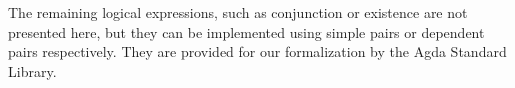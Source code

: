 \begin{code}
    \>[0]\AgdaSpace{}%
    \AgdaSymbol{:}\AgdaSpace{}%
    \AgdaSymbol{\{}\AgdaSpace{}%
    \AgdaSpace{}%
    \AgdaSymbol{:}\AgdaSpace{}%
    \AgdaSymbol{\}}\AgdaSpace{}%
    \AgdaSpace{}%
    \AgdaSpace{}%
    \AgdaSpace{}%
    \AgdaSpace{}%
    \AgdaSpace{}%
    \AgdaSpace{}%
    \AgdaSpace{}%
    \AgdaSpace{}%
    \AgdaSymbol{(}\AgdaSpace{}%
    \AgdaOperator{\AgdaFunction{+}}\AgdaSpace{}%
    \AgdaSymbol{)}\<%
    \\
    \>[0]\AgdaSpace{}%
    \AgdaSpace{}%
    \AgdaSpace{}%
    \AgdaSymbol{=}\AgdaSpace{}%
    \<%
    \\
    \>[0]\AgdaSpace{}%
    \AgdaSymbol{(}\AgdaSpace{}%
    \AgdaSymbol{)}\AgdaSpace{}%
    \AgdaSpace{}%
    \AgdaSymbol{=}\AgdaSpace{}%
    \AgdaSpace{}%
    \AgdaSymbol{(}\AgdaSpace{}%
    \AgdaSpace{}%
    \AgdaSymbol{)}\<%
\end{code}

The remaining logical expressions, such as conjunction or existence are not presented here, but they can be implemented using simple pairs or dependent pairs respectively. They are provided for our formalization by the Agda Standard Library\cite{agda-stdlib}.
